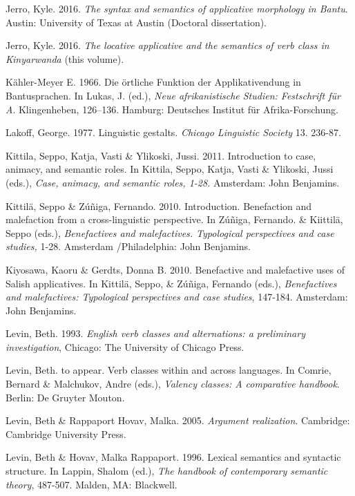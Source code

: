 \documentclass[output=paper]{langsci/langscibook}
\begin{document}
Jerro, Kyle. 2016. \textit{The syntax and semantics of applicative morphology in Bantu}. Austin: University of Texas at Austin (Doctoral dissertation). 

Jerro, Kyle. 2016. \textit{The locative applicative and the semantics of verb class in Kinyarwanda} (this volume).

Kähler-Meyer E. 1966. Die örtliche Funktion der Applikativendung in Bantusprachen. In Lukas, J. (ed.), \textit{Neue afrikanistische Studien: Festschrift für A}. Klingenheben, 126–136. Hamburg: Deutsches Institut für Afrika-Forschung.

Lakoff, George. 1977. Linguistic gestalts. \textit{Chicago Linguistic Society }13. 236-87.

Kittila, Seppo, Katja, Vasti \& Ylikoski, Jussi. 2011. Introduction to case, animacy, and semantic roles. In Kittila, Seppo, Katja, Vasti \& Ylikoski, Jussi (eds.), \textit{Case, animacy,   and semantic roles, 1-28.} Amsterdam: John Benjamins.

Kittilä, Seppo \& Zúñiga, Fernando. 2010. Introduction. Benefaction and malefaction from a cross-linguistic perspective. In Zúñiga, Fernando. \& Kiittil\"{a}, Seppo (eds.), \textit{Benefactives and malefactives. Typological perspectives and case studies, }1-28. Amsterdam /Philadelphia: John Benjamins.

Kiyosawa, Kaoru \& Gerdts, Donna B. 2010. Benefactive and malefactive uses of Salish applicatives. In Kittilä, Seppo, \& Zúñiga, Fernando (eds.), \textit{Benefactives and malefactives: Typological perspectives and case studies}, 147-184. Amsterdam: John Benjamins.

\begin{styleNormalWeb}
Levin, Beth. 1993. \textit{English verb classes and alternations: a preliminary investigation}, Chicago: The   University of Chicago Press.   
\end{styleNormalWeb}

\begin{styleNormalWeb}
Levin, Beth. to appear. Verb classes within and across languages. In Comrie, Bernard \& Malchukov, Andre (eds.), \textit{Valency classes: A comparative handbook}. Berlin: De Gruyter Mouton.
\end{styleNormalWeb}

Levin, Beth \& Rappaport Hovav, Malka. 2005. \textit{Argument realization}. Cambridge: Cambridge University Press.

Levin, Beth \& Hovav, Malka Rappaport. 1996. Lexical semantics and syntactic structure. In Lappin, Shalom (ed.), \textit{The handbook of contemporary semantic theory}, 487-507. Malden, MA: Blackwell.
\end{document}
